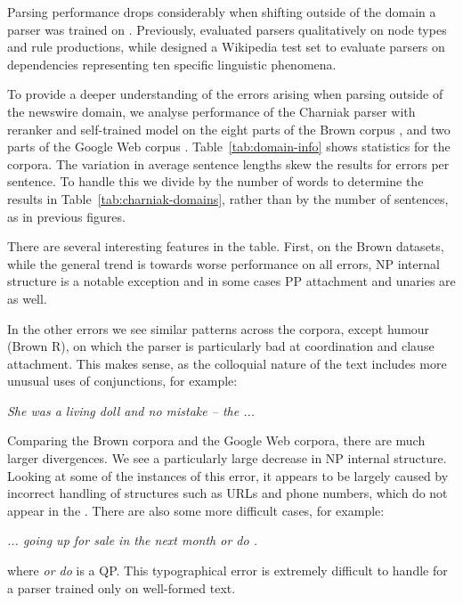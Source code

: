 Parsing performance drops considerably when shifting outside of the domain a
parser was trained on \parencite{Gildea:2001}.
Previously, \textcite{Clegg:2005:EIT:1626315.1626317} evaluated parsers qualitatively on
node types and rule productions, while  \textcite{Bender:2011:PEO:2145432.2145479}
designed a Wikipedia test set to evaluate parsers on dependencies representing
ten specific linguistic phenomena.

To provide a deeper understanding of the errors arising when parsing outside of
the newswire domain, we analyse performance of the Charniak parser with
reranker and self-trained model on the eight parts of the Brown corpus
\parencite{ptb}, and two parts of the Google Web
corpus \parencite{Petrov:2012}.  Table~\ref{tab:domain-info} shows statistics for
the corpora.  The variation in average sentence lengths skew the results for
errors per sentence.  To handle this we divide by the number of words to
determine the results in Table~\ref{tab:charniak-domains}, rather than by the
number of sentences, as in previous figures.

There are several interesting features in the table.  First, on the Brown
datasets, while the general trend is towards worse performance on all errors,
NP internal structure is a notable exception and in some cases PP attachment
and unaries are as well.

In the other errors we see similar patterns across the corpora, except humour
(Brown R), on which the parser is particularly bad at coordination and clause
attachment.  This makes sense, as the colloquial nature of the text includes
more unusual uses of conjunctions, for example:

\vspace{3mm}
\emph{She was a living doll and no mistake -- the ... }
\vspace{3mm}

Comparing the Brown corpora and the Google Web corpora, there are much larger
divergences.  We see a particularly large decrease in NP internal structure.
Looking at some of the instances of this error, it appears to be largely caused
by incorrect handling of structures such as URLs and phone numbers, which do
not appear in the \ptb.  There are also some more difficult cases, for example:

\vspace{3mm}
\emph{... going up for sale in the next month or do .}
\vspace{3mm}

\noindent where \emph{or do} is a QP.  This typographical error is extremely
difficult to handle for a parser trained only on well-formed text.

